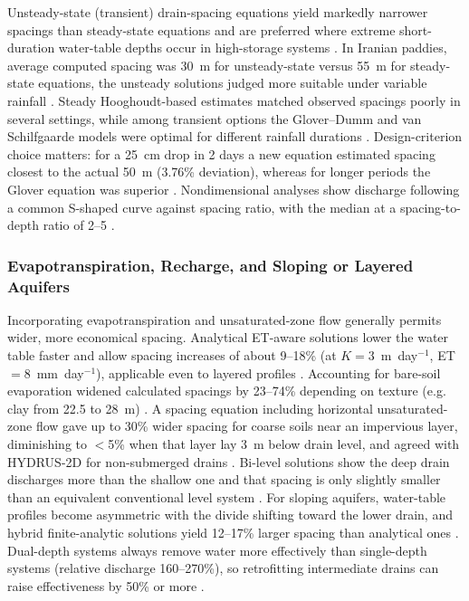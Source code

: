 Unsteady-state (transient) drain-spacing equations yield markedly narrower spacings than steady-state equations and are preferred where extreme short-duration water-table depths occur in high-storage systems \parencite{OOSTERBAAN1988}. In Iranian paddies, average computed spacing was 30~m for unsteady-state versus 55~m for steady-state equations, the unsteady solutions judged more suitable under variable rainfall \parencite{DarziNaftchally2014}. Steady Hooghoudt-based estimates matched observed spacings poorly in several settings, while among transient options the Glover--Dumm and van Schilfgaarde models were optimal for different rainfall durations \parencite{Moshayedi2020}. Design-criterion choice matters: for a 25~cm drop in 2 days a new equation estimated spacing closest to the actual 50~m (3.76\% deviation), whereas for longer periods the Glover equation was superior \parencite{Pali2014}. Nondimensional analyses show discharge following a common S-shaped curve against spacing ratio, with the median at a spacing-to-depth ratio of 2--5 \parencite{Nédélec2010}.

\subsubsection{Evapotranspiration, Recharge, and Sloping or Layered Aquifers}

Incorporating evapotranspiration and unsaturated-zone flow generally permits wider, more economical spacing. Analytical ET-aware solutions lower the water table faster and allow spacing increases of about 9--18\% (at $K=3$~m~day$^{-1}$, ET $=8$~mm~day$^{-1}$), applicable even to layered profiles \parencite{NIKAM1992,Singh2010,Upadhyaya2000}. Accounting for bare-soil evaporation widened calculated spacings by 23--74\% depending on texture (e.g. clay from 22.5 to 28~m) \parencite{AbdelFattah2005}. A spacing equation including horizontal unsaturated-zone flow gave up to 30\% wider spacing for coarse soils near an impervious layer, diminishing to $<$5\% when that layer lay 3~m below drain level, and agreed with HYDRUS-2D for non-submerged drains \parencite{Yousfi2014}. Bi-level solutions show the deep drain discharges more than the shallow one and that spacing is only slightly smaller than an equivalent conventional level system \parencite{Verma1998,Upadhyaya2000,Kankarej2023}. For sloping aquifers, water-table profiles become asymmetric with the divide shifting toward the lower drain, and hybrid finite-analytic solutions yield 12--17\% larger spacing than analytical ones \parencite{Singh2010,Upadhyaya2013,Hartani2001}. Dual-depth systems always remove water more effectively than single-depth systems (relative discharge 160--270\%), so retrofitting intermediate drains can raise effectiveness by 50\% or more \parencite{Kirkham1997}.

